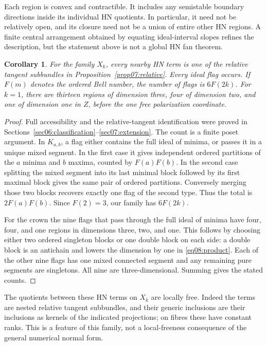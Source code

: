 \documentclass[11pt]{amsart}
\newtheorem{corollary}[theorem]{Corollary}
\theoremstyle{definition}
\theoremstyle{remark}
\begin{document}
Each region is convex and contractible. It includes any semistable
boundary directions inside its individual HN quotients. In particular,
it need not be relatively open, and its closure need not be a union
of entire other HN regions. A finite central arrangement obtained by
equating ideal-interval slopes refines the description, but the
statement above is not a global HN fan theorem.

\begin{corollary}\label{cor08:counts}
For the family \(X_k\), every nearby HN term is one of the relative
tangent subbundles in Proposition~\ref{prop07:relative}. Every ideal
flag occurs. If \(F(m)\) denotes the ordered Bell number, the number
of flags is \(6F(2k)\). For \(k=1\), there are thirteen regions of
dimension three, four of dimension two, and one of dimension one
in \(Z\), before the one free polarization coordinate.
\end{corollary}

\begin{proof}
Full accessibility and the relative-tangent identification were
proved in Sections~\ref{sec06:classification}--\ref{sec07:extension}.
The count is a finite poset argument. In \(K_{a,b}\), a flag either
contains the full ideal of minima, or passes it in a unique mixed
segment. In the first case it gives independent ordered partitions
of the \(a\) minima and \(b\) maxima, counted by \(F(a)F(b)\).
In the second case splitting the mixed segment into its last
minimal block followed by its first maximal block gives the same
pair of ordered partitions. Conversely merging those two blocks
recovers exactly one flag of the second type. Thus the total is
\(2F(a)F(b)\). Since \(F(2)=3\), our family has \(6F(2k)\).

For the crown the nine flags that pass through the full ideal of
minima have four, four, and one regions in dimensions three, two,
and one. This follows by choosing either two ordered singleton
blocks or one double block on each side: a double block is an
antichain and lowers the dimension by one in
\eqref{eq08:product}. Each of the other nine flags has one mixed
connected segment and any remaining pure segments are singletons.
All nine are three-dimensional. Summing gives the stated counts.
\end{proof}

The quotients between these HN terms on \(X_k\) are locally free.
Indeed the terms are nested relative tangent subbundles, and their
generic inclusions are their inclusions as kernels of the indicated
projections; on fibres these have constant ranks. This is a feature
of this family, not a local-freeness consequence of the general
numerical normal form.
\end{document}
